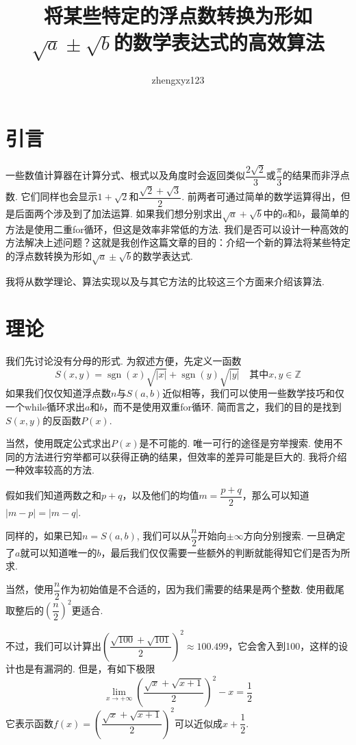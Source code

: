 \documentclass[a4paper, UTF8]{ctexart}
\title{将某些特定的浮点数转换为形如$\sqrt{a}\pm\sqrt{b}$的数学表达式的高效算法}
\author{zhengxyz123}
\DeclareMathOperator{\sgn}{\mathrm{sgn}}
\begin{document}
\maketitle

\section{引言}
一些数值计算器在计算分式、根式以及角度时会返回类似$\dfrac{2\sqrt{2}}{3}$或$\dfrac{\pi}{3}$的结果而非浮点数. 它们同样也会显示$1+\sqrt{2}$和$\dfrac{\sqrt{2}+\sqrt{3}}{2}$. 前两者可通过简单的数学运算得出，但是后面两个涉及到了加法运算. 如果我们想分别求出$\sqrt{a}+\sqrt{b}$中的$a$和$b$，最简单的方法是使用二重for循环，但这是效率非常低的方法. 我们是否可以设计一种高效的方法解决上述问题？这就是我创作这篇文章的目的：介绍一个新的算法将某些特定的浮点数转换为形如$\sqrt{a}\pm\sqrt{b}$的数学表达式.

我将从数学理论、算法实现以及与其它方法的比较这三个方面来介绍该算法.

\section{理论}
我们先讨论没有分母的形式. 为叙述方便，先定义一函数\[S(x,y)=\sgn(x)\sqrt{|x|}+\sgn(y)\sqrt{|y|} \quad\mbox{其中}x,y\in\mathbb{Z}\]如果我们仅仅知道浮点数$n$与$S(a,b)$近似相等，我们可以使用一些数学技巧和仅一个while循环求出$a$和$b$，而不是使用双重for循环. 简而言之，我们的目的是找到$S(x,y)$的反函数$P(x)$.

当然，使用既定公式求出$P(x)$是不可能的. 唯一可行的途径是穷举搜索. 使用不同的方法进行穷举都可以获得正确的结果，但效率的差异可能是巨大的. 我将介绍一种效率较高的方法.

假如我们知道两数之和$p+q$，以及他们的均值$m=\dfrac{p+q}{2}$，那么可以知道$|m-p|=|m-q|$.

同样的，如果已知$n=S(a,b)$, 我们可以从$\dfrac{n}{2}$开始向$\pm\infty$方向分别搜索. 一旦确定了$a$就可以知道唯一的$b$，最后我们仅仅需要一些额外的判断就能得知它们是否为所求.

当然，使用$\dfrac{n}{2}$作为初始值是不合适的，因为我们需要的结果是两个整数. 使用截尾取整后的$\left(\dfrac{n}{2}\right)^2$更适合.

不过，我们可以计算出$\left(\dfrac{\sqrt{100}+\sqrt{101}}{2}\right)^2\approx100.499$，它会舍入到100，这样的设计也是有漏洞的. 但是，有如下极限\[\lim_{x\to+\infty}\left(\frac{\sqrt{x}+\sqrt{x+1}}{2}\right)^2-x=\frac{1}{2}\]它表示函数$f(x)=\left(\dfrac{\sqrt{x}+\sqrt{x+1}}{2}\right)^2$可以近似成$x+\dfrac{1}{2}$.
\end{document}

